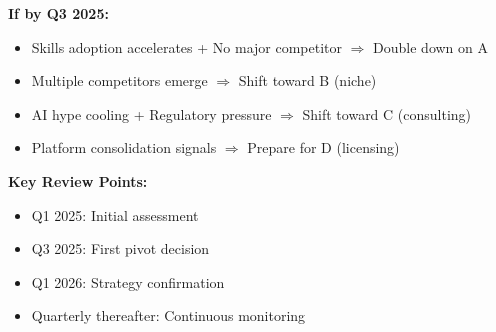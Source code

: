 \begin{tcolorbox}[colback=yellow!5!white, colframe=yellow!75!black,
    title=Decision Tree: When to Pivot]

\textbf{If by Q3 2025:}
\begin{itemize}[nosep]
\item Skills adoption accelerates + No major competitor $\Rightarrow$ Double down on A
\item Multiple competitors emerge $\Rightarrow$ Shift toward B (niche)
\item AI hype cooling + Regulatory pressure $\Rightarrow$ Shift toward C (consulting)
\item Platform consolidation signals $\Rightarrow$ Prepare for D (licensing)
\end{itemize}

\textbf{Key Review Points:}
\begin{itemize}[nosep]
\item Q1 2025: Initial assessment
\item Q3 2025: First pivot decision
\item Q1 2026: Strategy confirmation
\item Quarterly thereafter: Continuous monitoring
\end{itemize}

\end{tcolorbox}

